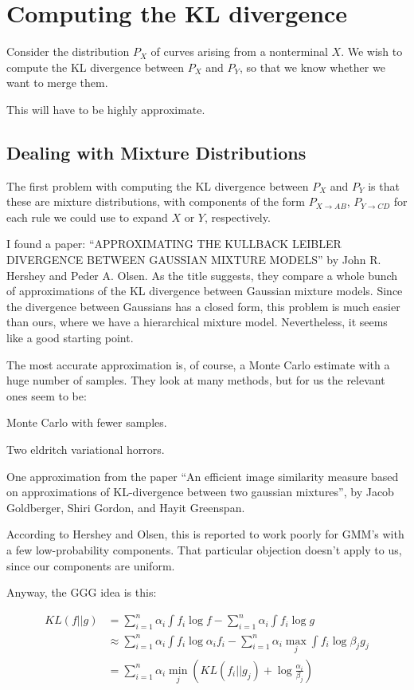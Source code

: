 \section{Computing the KL divergence}

Consider the distribution $P_X$ of curves arising from a nonterminal
$X$.  We wish to compute the KL divergence between $P_X$ and $P_Y$, so
that we know whether we want to merge them.

This will have to be highly approximate.

\subsection{Dealing with Mixture Distributions}

The first problem with computing the KL divergence between $P_X$ and
$P_Y$ is that these are mixture distributions, with components of the
form $P_{X\to AB}$, $P_{Y\to CD}$ for each rule we could use to expand
$X$ or $Y$, respectively.

I found a paper: ``APPROXIMATING THE KULLBACK LEIBLER DIVERGENCE
BETWEEN GAUSSIAN MIXTURE MODELS'' by John R. Hershey and Peder
A. Olsen. As the title suggests, they compare a whole bunch of
approximations of the KL divergence between Gaussian mixture
models. Since the divergence between Gaussians has a closed form, this
problem is much easier than ours, where we have a hierarchical mixture
model. Nevertheless, it seems like a good starting point.

The most accurate approximation is, of course, a Monte Carlo estimate
with a huge number of samples. They look at many methods, but for us
the relevant ones seem to be:

\bitem
\item Monte Carlo with fewer samples. 
\item Two eldritch variational horrors.
\item One approximation from the paper ``An efficient image similarity
  measure based on approximations of KL-divergence between two
  gaussian mixtures'', by Jacob Goldberger, Shiri Gordon, and Hayit
  Greenspan.

  According to Hershey and Olsen, this is reported to work poorly for
  GMM's with a few low-probability components. That particular
  objection doesn't apply to us, since our components are uniform.
\eitem

Anyway, the GGG idea is this:

\begin{align*}
KL(f || g) &= \sum_{i=1}^n \alpha_i \int f_i \log f - \sum_{i=1}^n \alpha_i \int f_i \log g\\
&\approx \sum_{i=1}^n \alpha_i \int f_i \log \alpha_i f_i - \sum_{i=1}^n \alpha_i \max_j \int f_i \log \beta_j g_j\\
&= \sum_{i=1}^n \alpha_i \min_j \left( KL(f_i || g_j) + \log \frac{\alpha_i}{\beta_j} \right)
\end{align*}

